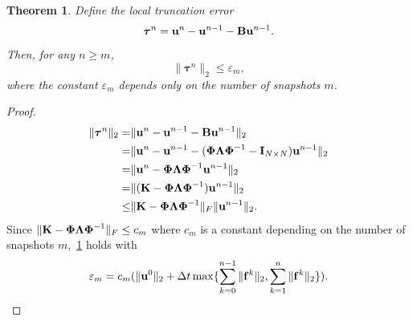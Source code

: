 \documentclass[10pt]{article}
\numberwithin{equation}{section}
\theoremstyle{plain}
\newtheorem{theorem}{Theorem}[section]
\theoremstyle{remark}
\theoremstyle{remark}
\begin{document}
\begin{theorem}\label{thm:t3-4}
Define the local truncation error
\begin{equation}\label{eq:3-8}
\boldsymbol \tau^n = \bold u^n-\bold u^{n-1}-\bold B\bold u^{n-1}.
\end{equation}
Then, for any $n\geq m$,
\begin{equation}\label{eq:3-9}
\|\boldsymbol \tau^n\|_2\leq \varepsilon_m,
\end{equation}
where the constant $\varepsilon_m$ depends only on the number of snapshots $m$.
\end{theorem}
\begin{proof}
\begin{equation}\label{eq:3-10}
\begin{aligned}
\|\boldsymbol \tau^n\|_2 =&\| \bold u^n-\bold u^{n-1}-\bold B\bold u^{n-1}\|_2\\
=&\| \bold u^n-\bold u^{n-1}-(\boldsymbol\Phi\boldsymbol\Lambda\boldsymbol\Phi^{-1}-\bold I_{N\times N})\bold u^{n-1}\|_2\\
=&\| \bold u^n-\boldsymbol\Phi\boldsymbol\Lambda\boldsymbol\Phi^{-1}\bold u^{n-1}\|_2\\
=&\|(\bold K-\boldsymbol\Phi\boldsymbol\Lambda\boldsymbol\Phi^{-1})\bold u^{n-1}\|_2\\
\leq&\|\bold K-\boldsymbol\Phi\boldsymbol\Lambda\boldsymbol\Phi^{-1}\|_F\|\bold u^{n-1}\|_2.
\end{aligned}
\end{equation}
Since $\|\bold K-\boldsymbol\Phi\boldsymbol\Lambda\boldsymbol\Phi^{-1}\|_F\leq c_m$ where $c_m$ is a constant depending on the number of snapshots $m$,~\cref{thm:t3-4} holds with
\begin{equation}\label{eq:3-11}
\varepsilon_m = c_m(\|\bold u^0\|_2+\Delta t\max\{\sum_{k=0}^{n-1}\|\bold f^k\|_2,\sum_{k=1}^{n}\|\bold f^k\|_2\}).
\end{equation}
\end{proof}
\end{document}
